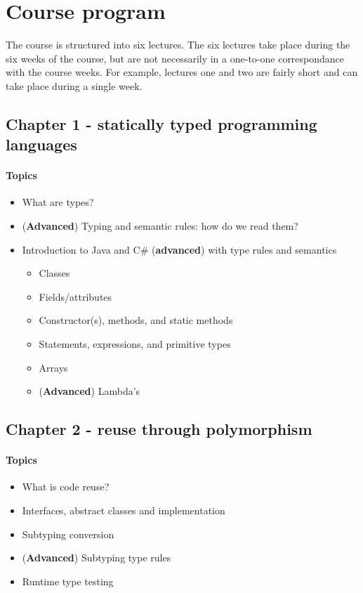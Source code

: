 \section{Course program}
The course is structured into six lectures.
The six lectures take place during the six weeks of the course, but are not necessarily in a one-to-one correspondance with the course weeks. For example, lectures one and two are fairly short and can take place during a single week.

\subsection{Chapter 1 - statically typed programming languages}
\paragraph*{Topics}
\begin{itemize}
	\item What are types?
	\item (\textbf{Advanced}) Typing and semantic rules: how do we read them?
	\item Introduction to Java and C\# (\textbf{advanced}) with type rules and semantics
	\begin{itemize}
		\item Classes
		\item Fields/attributes
		\item Constructor(s), methods, and static methods
		\item Statements, expressions, and primitive types
		\item Arrays
		\item (\textbf{Advanced}) Lambda's
	\end{itemize}
\end{itemize}

\subsection{Chapter 2 - reuse through polymorphism}
\paragraph*{Topics}			
\begin{itemize}
	\item What is code reuse?
	\item Interfaces, abstract classes and implementation
	\item Subtyping conversion
	\item (\textbf{Advanced}) Subtyping type rules
	\item Runtime type testing
\end{itemize}


